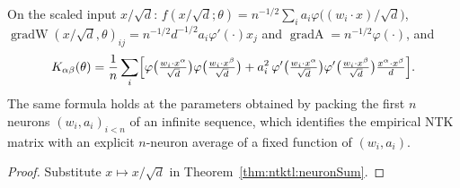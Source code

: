 \begin{theorem}\label{thm:ntktl:scaledDataset}
  \leanok
On the scaled input $x/\sqrt d$: $f(x/\sqrt d;\theta)=n^{-1/2}\sum_ia_i\varphi\bigl((w_i\cdot x)/\sqrt d\bigr)$, $\operatorname{gradW}(x/\sqrt d,\theta)_{ij}=n^{-1/2}d^{-1/2}a_i\varphi'(\cdot)x_j$ and $\operatorname{gradA}=n^{-1/2}\varphi(\cdot)$, and
\[
  K_{\alpha\beta}(\theta)=\frac1n\sum_i\Bigl[\varphi\bigl(\tfrac{w_i\cdot x^\alpha}{\sqrt d}\bigr)\varphi\bigl(\tfrac{w_i\cdot x^\beta}{\sqrt d}\bigr)+a_i^2\,\varphi'\bigl(\tfrac{w_i\cdot x^\alpha}{\sqrt d}\bigr)\varphi'\bigl(\tfrac{w_i\cdot x^\beta}{\sqrt d}\bigr)\tfrac{x^\alpha\cdot x^\beta}{d}\Bigr].
\]
The same formula holds at the parameters obtained by packing the first $n$ neurons $(w_i,a_i)_{i<n}$ of an infinite sequence, which identifies the empirical NTK matrix with an explicit $n$-neuron average of a fixed function of $(w_i,a_i)$.
\end{theorem}

\begin{proof}
  \leanok
Substitute $x\mapsto x/\sqrt d$ in Theorem~\ref{thm:ntktl:neuronSum}.
\end{proof}


